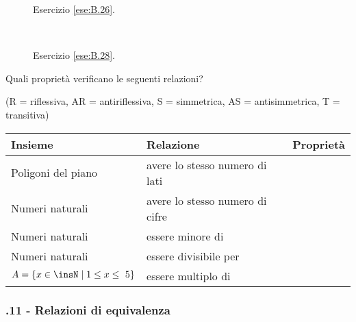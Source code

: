 \begin{figure}[t]
\begin{minipage}[b]{.45\textwidth}
 \centering
 
 \caption{Esercizio \ref{ese:B.26}.}\label{fig:B.17}
\end{minipage}\
\begin{minipage}[b]{.45\textwidth}
 \centering
 
 \caption{Esercizio \ref{ese:B.28}.}\label{fig:B.18}
\end{minipage}
\end{figure}

\begin{esercizio}
\label{ese:B.29}
Quali proprietà verificano le seguenti relazioni?
\begin{center}
(R = riflessiva, AR = antiriflessiva, S = simmetrica, AS = antisimmetrica, T = transitiva)
\end{center}
\begin{center}
\begin{tabular}{llc}
\toprule
Insieme & Relazione & Proprietà\\
\midrule
Poligoni del piano & avere lo stesso numero di lati & \boxR\quad\boxAR\quad\boxS\quad\boxAS\quad\boxT\\
Numeri naturali & avere lo stesso numero di cifre &\boxR\quad\boxAR\quad\boxS\quad\boxAS\quad\boxT\\
Numeri naturali & essere minore di &\boxR\quad\boxAR\quad\boxS\quad\boxAS\quad\boxT\\
Numeri naturali & essere divisibile per &\boxR\quad\boxAR\quad\boxS\quad\boxAS\quad\boxT\\
$A = \{ x \in \insN \mid  1 \le x \le~5 \}$ & essere multiplo di &\boxR\quad\boxAR\quad\boxS\quad\boxAS\quad\boxT\\
\bottomrule
\end{tabular}
\end{center}
\end{esercizio}

\pagebreak
\subsubsection*{\thechapter.11 - Relazioni di equivalenza}

